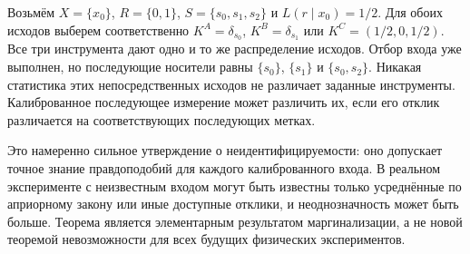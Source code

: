 \begin{example}
\label{ex:same-outcome}
{Возьмём $X=\{x_0\}$, $R=\{0,1\}$, $S=\{s_0,s_1,s_2\}$ и $L(r\mid x_0)=1/2$. Для обоих исходов выберем соответственно $K^A=\delta_{s_0}$, $K^B=\delta_{s_1}$ или $K^C=(1/2,0,1/2)$. Все три инструмента дают одно и то же распределение исходов. Отбор входа уже выполнен, но последующие носители равны $\{s_0\}$, $\{s_1\}$ и $\{s_0,s_2\}$. Никакая статистика этих непосредственных исходов не различает заданные инструменты. Калиброванное последующее измерение может различить их, если его отклик различается на соответствующих последующих метках.}
\end{example}

{Это намеренно сильное утверждение о неидентифицируемости: оно допускает точное знание правдоподобий для каждого калиброванного входа. В реальном эксперименте с неизвестным входом могут быть известны только усреднённые по априорному закону или иные доступные отклики, и неоднозначность может быть больше. Теорема является элементарным результатом маргинализации, а не новой теоремой невозможности для всех будущих физических экспериментов.}

